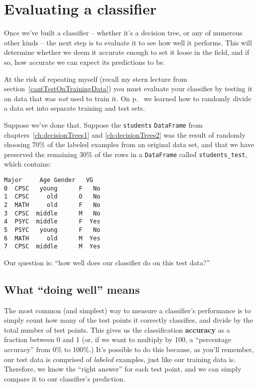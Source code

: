 
\chapter{Evaluating a classifier}

Once we've built a classifier -- whether it's a decision tree, or any of
numerous other kinds -- the next step is to evaluate it to see how well it
performs. This will determine whether we deem it accurate enough to set it
loose in the field, and if so, how accurate we can expect its predictions to
be.

At the risk of repeating myself (recall my stern lecture from
section~\ref{cantTestOnTrainingData}) you must evaluate your classifier by
testing it on data that was \textit{not} used to train it. On
p.~\pageref{sampleRows} we learned how to randomly divide a data set into
separate training and test sets.

Suppose we've done that. Suppose the \texttt{students} \texttt{DataFrame} from
chapters~\ref{ch:decisionTrees1} and \ref{ch:decisionTrees2} was the result of
randomly choosing 70\% of the labeled examples from an original data set, and
that we have preserved the remaining 30\% of the rows in a \texttt{DataFrame}
called \texttt{students\_test}, which contains:

\begin{Verbatim}[fontsize=\small,samepage=true,frame=single,framesep=3mm,xleftmargin=4.2cm,xrightmargin=4.1cm]
  Major     Age Gender   VG
0  CPSC   young      F   No
1  CPSC     old      O   No
2  MATH     old      F   No
3  CPSC  middle      M   No
4  PSYC  middle      F  Yes
5  PSYC   young      F   No
6  MATH     old      M  Yes
7  CPSC  middle      M  Yes
\end{Verbatim}

Our question is: ``how well does our classifier do on this test data?''

\section{What ``doing well'' means}


The most common (and simplest) way to measure a classifier's performance is to
simply count how many of the test points it correctly classifies, and divide by
the total number of test points. This gives us the classification
\textbf{accuracy} as a fraction between 0 and 1 (or, if we want to multiply by
100, a ``percentage accuracy'' from 0\% to 100\%.) It's possible to do this
because, as you'll remember, our test data is comprised of \textit{labeled}
examples, just like our training data is. Therefore, we know the ``right
answer'' for each test point, and we can simply compare it to our classifier's
prediction.

